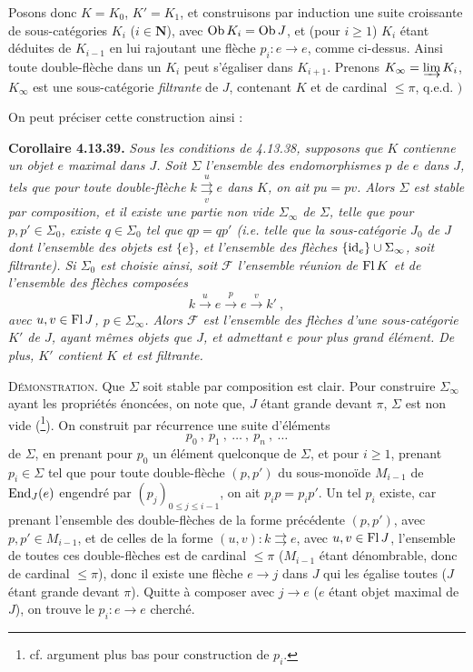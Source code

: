 Posons donc $K = K_0$, $K' = K_1$, et construisons par induction une suite croissante de sous-catégories $K_i$ ($i \in \mathbf{N}$), avec $\operatorname{Ob} K_i = \operatorname{Ob} J$, et (pour $i \geqslant 1$) $K_i$ étant déduites de $K_{i-1}$ en lui rajoutant une flèche $p_i : e \longrightarrow e$, comme ci-dessus. Ainsi toute double-flèche dans un $K_i$ peut s'égaliser dans $K_{i+1}$. Prenons $K_\infty = \varinjlim K_i$, $K_\infty$ est une sous-catégorie \textit{filtrante} de $J$, contenant $K$ et de cardinal $\leqslant \pi$, q.e.d. $\Biggr)$

On peut préciser cette construction ainsi :


\noindent\textbf{Corollaire 4.13.39.} {\itshape Sous les conditions de 4.13.38, supposons que $K$ contienne un objet $e$ maximal dans $J$. Soit $\Sigma$ l'ensemble des endomorphismes $p$ de $e$ dans $J$, tels que pour toute double-flèche $k \overset{u}{\underset{v}{\rightrightarrows}} e$ \textup{dans} $K$, on ait $pu=pv$. Alors $\Sigma$ est stable par composition, et il existe une partie non vide $\Sigma_\infty$ de $\Sigma$, telle que pour $p,p'\in\Sigma_0$, existe
$q\in\Sigma_0$ tel que $qp=qp'$ (i.e. telle que la sous-catégorie $J_0$ de $J$ dont l'ensemble des objets est $\{e\}$, et l'ensemble des flèches $\{\mathrm{id}_e\}\cup\Sigma_\infty$, soit filtrante). Si $\Sigma_0$ est choisie ainsi, soit $\mathcal{F}$ l'ensemble réunion de $\operatorname{Fl} K$ et de l'ensemble des flèches composées
\[
k \xrightarrow{\ u\ } e \xrightarrow{\ p\ } e \xrightarrow{\ v\ } k'\ , \tag*{$(*)$}
\]
avec $u,v\in\operatorname{Fl} J$, $p\in\Sigma_\infty$. Alors $\mathcal{F}$ est l'ensemble des flèches d'une sous-catégorie $K'$ de $J$, ayant mêmes objets que $J$, et admettant $e$ pour plus grand élément. De plus, $K'$ contient $K$ et est filtrante.}

\noindent\textsc{Démonstration}. Que $\Sigma$ soit stable par composition est clair. Pour construire $\Sigma_\infty$ ayant les propriétés énoncées, on note que, $J$ étant grande devant $\pi$, $\Sigma$ est non vide (\footnote[162]{cf. argument plus bas pour construction de $p_i$.}). On construit par récurrence une suite d'éléments
\[
p_0\ ,\ p_1\ ,\ \ldots\ ,\ p_n\ ,\ \ldots
\]
de $\Sigma$, en prenant pour $p_0$ un élément quelconque de $\Sigma$, et pour $i\geqslant 1$, prenant $p_i\in\Sigma$ tel que pour toute double-flèche $(p,p')$ du sous-monoïde $M_{i-1}$ de $\operatorname{End}_J(e)$ engendré par $(p_j)_{0\leqslant j\leqslant i-1}$, on ait $p_ip=p_ip'$. Un tel $p_i$ existe, car prenant l'ensemble des double-flèches de la forme précédente $(p,p')$, avec $p,p'\in M_{i-1}$, et de celles de la forme $(u,v) : k \rightrightarrows e$, avec $u,v\in\operatorname{Fl} J$, l'ensemble de
toutes ces double-flèches est de cardinal $\leqslant\pi$ ($M_{i-1}$ étant dénombrable, donc de cardinal $\leqslant\pi$), donc il existe une flèche $e\longrightarrow j$ dans $J$ qui les égalise toutes ($J$ étant grande devant $\pi$). Quitte à composer avec $j\longrightarrow e$ ($e$ étant objet maximal de $J$), on trouve le $p_i : e\longrightarrow e$ cherché.

